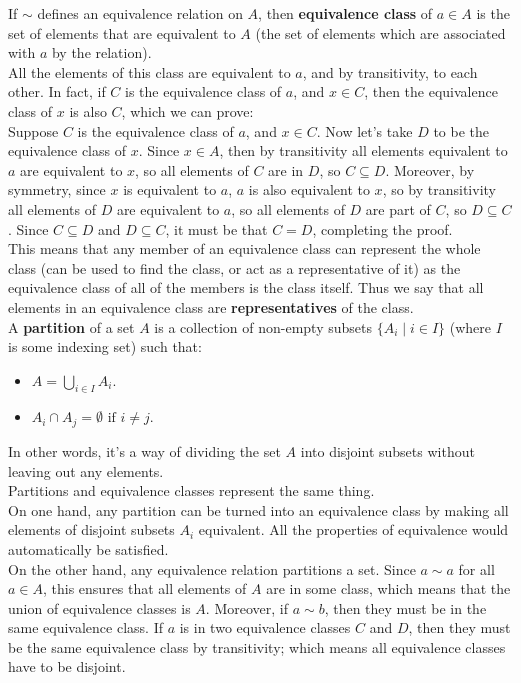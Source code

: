 \documentclass[12pt]{article}
\begin{document}
    If $\sim$ defines an equivalence relation on $A$,
    then \textbf{equivalence class} of $a \in A$
    is the set of elements that are equivalent to $A$
    (the set of elements which are associated with $a$ by the relation). \\
    All the elements of this class are equivalent to $a$,
    and by transitivity, to each other.
    In fact, if $C$ is the equivalence class of $a$,
    and $x \in C$, then the equivalence class of $x$ is also $C$,
    which we can prove: \\
    Suppose $C$ is the equivalence class of $a$,
    and $x \in C$.
    Now let's take $D$ to be the equivalence class of $x$.
    Since $x \in A$,
    then by transitivity all elements equivalent to $a$
    are equivalent to $x$,
    so all elements of $C$ are in $D$,
    so $C \subseteq D$.
    Moreover, by symmetry, since $x$ is equivalent to $a$,
    $a$ is also equivalent to $x$,
    so by transitivity all elements of $D$ are equivalent to $a$,
    so all elements of $D$ are part of $C$,
    so $D \subseteq C$.
    Since $C \subseteq D$ and $D \subseteq C$,
    it must be that $C = D$,
    completing the proof. \\
    This means that any member of an equivalence class
    can represent the whole class
    (can be used to find the class, or act as a representative of it)
    as the equivalence class of all of the members is the class itself.
    Thus we say that all elements in an equivalence class
    are \textbf{representatives} of the class. \\

    A \textbf{partition} of a set $A$ is a collection
    of non-empty subsets $\{ A_i \mid i \in I \}$
    (where $I$ is some indexing set) such that:
    \begin{itemize}[label=$\diamond$]
        \item 
            $A = \bigcup_{i \in I} A_i$.
        \item 
            $A_i \cap A_j = \emptyset \text{ if } i \neq j$.
    \end{itemize}
    In other words,
    it's a way of dividing the set $A$ into disjoint subsets
    without leaving out any elements. \\

    Partitions and equivalence classes represent the same thing. \\
    On one hand, any partition can be turned into 
    an equivalence class by making all elements of disjoint subsets $A_i$
    equivalent.
    All the properties of equivalence
    would automatically be satisfied. \\
    On the other hand,
    any equivalence relation partitions a set.
    Since $a \sim a$ for all $a \in A$,
    this ensures that all elements of $A$ are in some class,
    which means that the union of equivalence classes is $A$.
    Moreover, if $a \sim b$,
    then they must be in the same equivalence class.
    If $a$ is in two equivalence classes $C$ and $D$,
    then they must be the same equivalence class
    by transitivity;
    which means all equivalence classes have to be disjoint. \\
\end{document}
